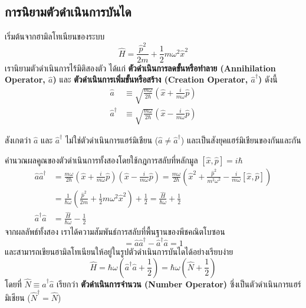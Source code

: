 \subsection{การนิยามตัวดำเนินการบันได}
เริ่มต้นจากฮามิลโทเนียนของระบบ
\begin{equation}
\hat{H} = \frac{\hat{p}^2}{2m} + \frac{1}{2}m\omega^2 \hat{x}^2
\end{equation}
เรานิยามตัวดำเนินการไร้มิติสองตัว ได้แก่ \textbf{ตัวดำเนินการลดขั้นหรือทำลาย (Annihilation Operator, $\hat{a}$)} และ \textbf{ตัวดำเนินการเพิ่มขั้นหรือสร้าง (Creation Operator, $\hat{a}^\dagger$)} ดังนี้
\begin{align}
\hat{a} &\equiv \sqrt{\frac{m\omega}{2\hbar}}\left( \hat{x} + \frac{i}{m\omega}\hat{p} \right) \label{eq_def_ladder_a} \\
\hat{a}^\dagger &\equiv \sqrt{\frac{m\omega}{2\hbar}}\left( \hat{x} - \frac{i}{m\omega}\hat{p} \right) \label{eq_def_ladder_adag}
\end{align}

สังเกตว่า $\hat{a}$ และ $\hat{a}^\dagger$ ไม่ใช่ตัวดำเนินการแฮร์มิเชียน ($\hat{a} \ne \hat{a}^\dagger$) และเป็นสังยุคแฮร์มิเชียนของกันและกัน

คำนวณผลคูณของตัวดำเนินการทั้งสองโดยใช้กฎการสลับที่หลักมูล $[\hat{x}, \hat{p}] = i\hbar$
\begin{align}
\hat{a}\hat{a}^\dagger &= \frac{m\omega}{2\hbar}\left( \hat{x} + \frac{i}{m\omega}\hat{p} \right)\left( \hat{x} - \frac{i}{m\omega}\hat{p} \right) = \frac{m\omega}{2\hbar}\left( \hat{x}^2 + \frac{\hat{p}^2}{m^2\omega^2} - \frac{i}{m\omega}[\hat{x}, \hat{p}] \right) \nonumber \\
&= \frac{1}{\hbar\omega}\left( \frac{\hat{p}^2}{2m} + \frac{1}{2}m\omega^2\hat{x}^2 \right) + \frac{1}{2} = \frac{\hat{H}}{\hbar\omega} + \frac{1}{2} \\
\hat{a}^\dagger\hat{a} &= \frac{\hat{H}}{\hbar\omega} - \frac{1}{2}
\end{align}
จากผลลัพธ์ทั้งสอง เราได้ความสัมพันธ์การสลับที่พื้นฐานของพีชคณิตโบซอน
\begin{equation}
[\hat{a}, \hat{a}^\dagger] = \hat{a}\hat{a}^\dagger - \hat{a}^\dagger\hat{a} = 1 \label{eq_boson_commutation}
\end{equation}
และสามารถเขียนฮามิลโทเนียนให้อยู่ในรูปตัวดำเนินการบันไดได้อย่างเรียบง่าย
\begin{equation}
\hat{H} = \hbar\omega\left( \hat{a}^\dagger\hat{a} + \frac{1}{2} \right) = \hbar\omega\left( \hat{N} + \frac{1}{2} \right)
\end{equation}
โดยที่ $\hat{N} \equiv \hat{a}^\dagger\hat{a}$ เรียกว่า \textbf{ตัวดำเนินการจำนวน (Number Operator)} ซึ่งเป็นตัวดำเนินการแฮร์มิเชียน ($\hat{N}^\dagger = \hat{N}$)

